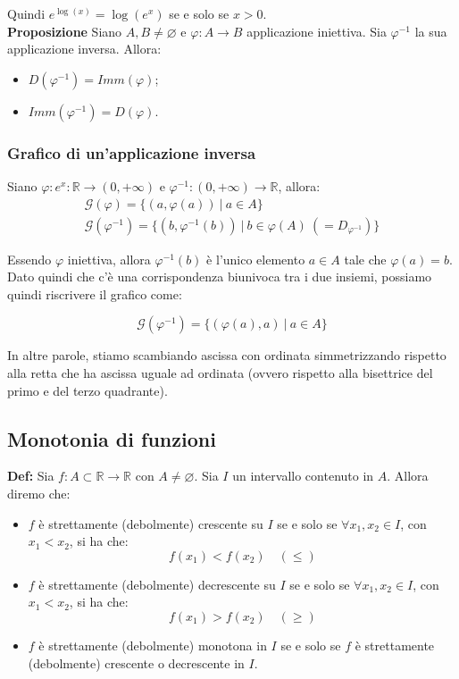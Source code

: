\documentclass{article}
\begin{document}
\noindent Quindi $e^{\log(x)} = \log(e^x)$ se e solo se $x > 0$.\\

\noindent\textbf{Proposizione} Siano $A, B \neq \varnothing$ e $\varphi: A \xrightarrow{} B$ applicazione iniettiva. Sia $\varphi^{-1}$ la sua applicazione inversa. Allora:

\begin{itemize}
    \item $D(\varphi^{-1}) = Imm(\varphi)$;
    \item $Imm(\varphi^{-1}) = D(\varphi)$.
\end{itemize}

\subsubsection{Grafico di un'applicazione inversa}
Siano $\varphi: e^x: \mathbb{R} \xrightarrow{} (0, + \infty)$ e $\varphi^{-1}: (0, + \infty) \xrightarrow{} \mathbb{R}$, allora:
\begin{gather*}
    \mathcal{G}(\varphi) = \{(a, \varphi(a)) \ | \ a \in A\}\\
    \mathcal{G}(\varphi^{-1}) = \{(b, \varphi^{-1}(b)) \ | \ b \in \varphi(A) \ (= D_{\varphi^{-1}})\} 
\end{gather*}

\noindent Essendo $\varphi$ iniettiva, allora $\varphi^{-1}(b)$ è l'unico elemento $a \in A$ tale che $\varphi(a) = b$. Dato quindi che c'è una corrispondenza biunivoca tra i due insiemi, possiamo quindi riscrivere il grafico come: 

\begin{equation*}
    \mathcal{G}(\varphi^{-1}) = \{(\varphi(a), a) \ | \ a \in A\}
\end{equation*}

\noindent In altre parole, stiamo scambiando ascissa con ordinata simmetrizzando rispetto alla retta che ha ascissa uguale ad ordinata (ovvero rispetto alla bisettrice del primo e del terzo quadrante).

\subsection{Monotonia di funzioni}
\textbf{Def:} Sia $f: A \subset \mathbb{R} \xrightarrow{} \mathbb{R}$ con $A \neq \varnothing$. Sia $I$ un intervallo contenuto in $A$. Allora diremo che:

\begin{itemize}
    \item $f$ è strettamente (debolmente) crescente su $I$ se e solo se $\forall x_1, x_2 \in I$, con $x_1 < x_2$, si ha che: $$f(x_1) < f(x_2) \quad (\leq)$$
    \item $f$ è strettamente (debolmente) decrescente su $I$ se e solo se $\forall x_1, x_2 \in I$, con $x_1 < x_2$, si ha che: $$f(x_1) > f(x_2) \quad (\geq)$$
    \item $f$ è strettamente (debolmente) monotona in $I$ se e solo se $f$ è strettamente (debolmente) crescente o decrescente in $I$.
\end{itemize}
\end{document}
